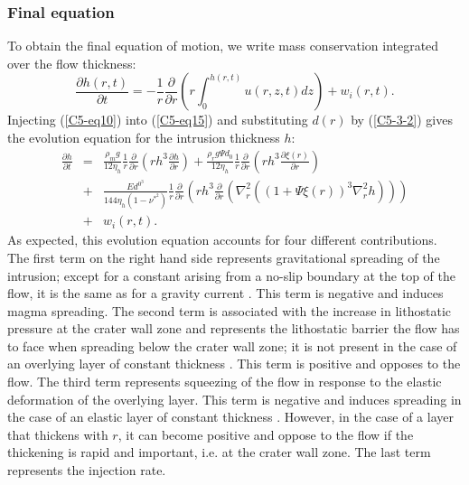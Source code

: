 \subsubsection{Final equation}
\label{C5-Final_Equation}

To obtain  the final  equation of motion,  we write  mass conservation
integrated over the flow thickness:
\begin{equation}
  \frac{\partial h(r,t)}{\partial t} = -\frac{1}{r} \frac{\partial}{\partial r} \left( r \int_{0}^{h(r,t)} u(r,z,t) dz\right ) + w_i(r,t) .
  \label{C5-eq15}
\end{equation}
Injecting  (\ref{C5-eq10})   into  (\ref{C5-eq15})   and  substituting
$d(r)$  by (\ref{C5-3-2})  gives  the evolution  equation for  the
intrusion thickness $h$:
\begin{eqnarray}
  \frac{\partial h}{\partial t} &=&\frac{\rho_{m}g}{12 \eta_h} \frac{1}{r} \frac{\partial}{\partial r}\left (r h^{3} \frac{\partial h}{\partial r} \right)+ \frac{\rho_rg\Psi d_0}{12 \eta_h} \frac{1}{r} \frac{\partial}{\partial r}\left ( r h^{3} \frac{\partial \xi(r)}{\partial r}\right ) \nonumber \\
                                &+&\frac{E       d^{0^{3}}}{144\eta_h
                                    (1-\nu^*^{2})}\frac{1}{r}\frac{\partial}{\partial
                                    r}\left       (      r       h^{3}
                                    \frac{\partial}{\partial        r}
                                    \left(\nabla^{2}_{r}      ((1+\Psi
                                    \xi(r))^{3}\nabla^{2}_{r}h )\right)\right )\nonumber\\
                                &+& w_i(r,t).
                                    \label{C5-eq16}
\end{eqnarray}
As  expected,  this evolution  equation  accounts  for four  different
contributions.   The first  term  on the  right  hand side  represents
gravitational  spreading  of  the  intrusion; except  for  a  constant
arising from a no-slip boundary at the top of the flow, it is the same
as for a gravity current  \citep{Huppert:1982a}. This term is negative
and induces  magma spreading. The  second term is associated  with the
increase  in  lithostatic  pressure  at   the  crater  wall  zone  and
represents the lithostatic barrier the flow has to face when spreading
below  the crater  wall zone;  it is  not present  in the  case of  an
overlying  layer of  constant thickness  \citep{Michaut:2011kg}.  This
term is positive  and opposes to the flow.  The  third term represents
squeezing of  the flow in response  to the elastic deformation  of the
overlying layer.  This  term is negative and induces  spreading in the
case    of     an    elastic     layer    of     constant    thickness
\citep{Michaut:2011kg}. However, in the case  of a layer that thickens
with  $r$, it  can  become positive  and  oppose to  the  flow if  the
thickening is rapid  and important, i.e. at the crater  wall zone. The
last term represents the injection rate.

